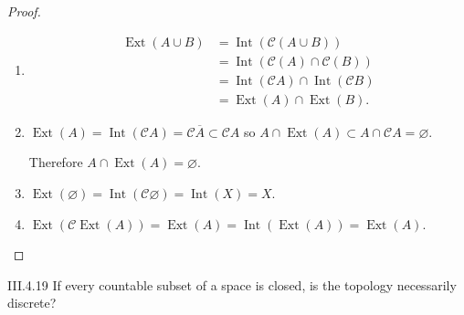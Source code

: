 \begin{proof}
	\begin{enumerate}[label={(\alph*)},leftmargin=*,itemsep=0pt]
		\item \begingroup
		      \allowdisplaybreaks%
		      \begin{align*}
			      \operatorname{Ext}(A \cup B) & = \operatorname{Int}(\mathscr{C}(A \cup B))                              \\
			                                   & = \operatorname{Int}(\mathscr{C}(A) \cap \mathscr{C}(B))                 \\
			                                   & = \operatorname{Int}(\mathscr{C}A) \cap \operatorname{Int}(\mathscr{C}B) \\
			                                   & = \operatorname{Ext}(A) \cap \operatorname{Ext}(B).
		      \end{align*}
		      \endgroup
		\item \( \operatorname{Ext}(A) = \operatorname{Int}(\mathscr{C}A) = \mathscr{C}\overline{A} \subset \mathscr{C}A \) so \( A \cap \operatorname{Ext}(A) \subset A \cap \mathscr{C}A = \varnothing \).

		      Therefore \( A \cap \operatorname{Ext}(A) = \varnothing \).
		\item \( \operatorname{Ext}(\varnothing) = \operatorname{Int}(\mathscr{C}\varnothing) = \operatorname{Int}(X) = X \).
		\item \( \operatorname{Ext}(\mathscr{C}\operatorname{Ext}(A)) = \operatorname{Ext}(A) = \operatorname{Int}(\operatorname{Ext}(A)) = \operatorname{Ext}(A) \).
	\end{enumerate}
\end{proof}

\begin{problem}{III.4.19}
If every countable subset of a space is closed, is the topology necessarily discrete?
\end{problem}

